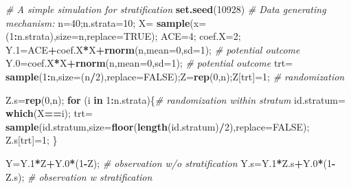 \documentclass[12pt,]{book}
\newenvironment{Shaded}{\begin{snugshade}}{\end{snugshade}}
\newcommand{\KeywordTok}[1]{\textcolor[rgb]{0.13,0.29,0.53}{\textbf{#1}}}
\newcommand{\DataTypeTok}[1]{\textcolor[rgb]{0.13,0.29,0.53}{#1}}
\newcommand{\DecValTok}[1]{\textcolor[rgb]{0.00,0.00,0.81}{#1}}
\newcommand{\StringTok}[1]{\textcolor[rgb]{0.31,0.60,0.02}{#1}}
\newcommand{\CommentTok}[1]{\textcolor[rgb]{0.56,0.35,0.01}{\textit{#1}}}
\newcommand{\OtherTok}[1]{\textcolor[rgb]{0.56,0.35,0.01}{#1}}
\newcommand{\ControlFlowTok}[1]{\textcolor[rgb]{0.13,0.29,0.53}{\textbf{#1}}}
\newcommand{\OperatorTok}[1]{\textcolor[rgb]{0.81,0.36,0.00}{\textbf{#1}}}
\newcommand{\NormalTok}[1]{#1}
\begin{document}
\begin{Shaded}
\begin{Highlighting}[]
\CommentTok{# A simple simulation for stratification }
\KeywordTok{set.seed}\NormalTok{(}\DecValTok{10928}\NormalTok{)}
\CommentTok{# Data generating mechanism: }
\NormalTok{n=}\DecValTok{40}\NormalTok{;n.strata=}\DecValTok{10}\NormalTok{;}
\NormalTok{X=}\StringTok{ }\KeywordTok{sample}\NormalTok{(}\DataTypeTok{x=}\NormalTok{(}\DecValTok{1}\OperatorTok{:}\NormalTok{n.strata),}\DataTypeTok{size=}\NormalTok{n,}\DataTypeTok{replace=}\OtherTok{TRUE}\NormalTok{);}
\NormalTok{ACE=}\DecValTok{4}\NormalTok{; coef.X=}\DecValTok{2}\NormalTok{; }
\NormalTok{Y.}\DecValTok{1}\NormalTok{=ACE}\OperatorTok{+}\NormalTok{coef.X}\OperatorTok{*}\NormalTok{X}\OperatorTok{+}\KeywordTok{rnorm}\NormalTok{(n,}\DataTypeTok{mean=}\DecValTok{0}\NormalTok{,}\DataTypeTok{sd=}\DecValTok{1}\NormalTok{); }\CommentTok{# potential outcome}
\NormalTok{Y.}\DecValTok{0}\NormalTok{=coef.X}\OperatorTok{*}\NormalTok{X}\OperatorTok{+}\KeywordTok{rnorm}\NormalTok{(n,}\DataTypeTok{mean=}\DecValTok{0}\NormalTok{,}\DataTypeTok{sd=}\DecValTok{1}\NormalTok{); }\CommentTok{# potential outcome }
\NormalTok{trt=}\StringTok{ }\KeywordTok{sample}\NormalTok{(}\DecValTok{1}\OperatorTok{:}\NormalTok{n,}\DataTypeTok{size=}\NormalTok{(n}\OperatorTok{/}\DecValTok{2}\NormalTok{),}\DataTypeTok{replace=}\OtherTok{FALSE}\NormalTok{);Z=}\KeywordTok{rep}\NormalTok{(}\DecValTok{0}\NormalTok{,n);Z[trt]=}\DecValTok{1}\NormalTok{; }\CommentTok{# randomization}

\NormalTok{Z.s=}\KeywordTok{rep}\NormalTok{(}\DecValTok{0}\NormalTok{,n);}
\ControlFlowTok{for}\NormalTok{ (i }\ControlFlowTok{in} \DecValTok{1}\OperatorTok{:}\NormalTok{n.strata)\{}\CommentTok{# randomization within stratum }
\NormalTok{  id.stratum=}\StringTok{ }\KeywordTok{which}\NormalTok{(X}\OperatorTok{==}\NormalTok{i);}
\NormalTok{  trt=}\StringTok{ }\KeywordTok{sample}\NormalTok{(id.stratum,}\DataTypeTok{size=}\KeywordTok{floor}\NormalTok{(}\KeywordTok{length}\NormalTok{(id.stratum)}\OperatorTok{/}\DecValTok{2}\NormalTok{),}\DataTypeTok{replace=}\OtherTok{FALSE}\NormalTok{);}
\NormalTok{  Z.s[trt]=}\DecValTok{1}\NormalTok{; }
\NormalTok{\}}

\NormalTok{Y=Y.}\DecValTok{1}\OperatorTok{*}\NormalTok{Z}\OperatorTok{+}\NormalTok{Y.}\DecValTok{0}\OperatorTok{*}\NormalTok{(}\DecValTok{1}\OperatorTok{-}\NormalTok{Z); }\CommentTok{# observation w/o stratification }
\NormalTok{Y.s=Y.}\DecValTok{1}\OperatorTok{*}\NormalTok{Z.s}\OperatorTok{+}\NormalTok{Y.}\DecValTok{0}\OperatorTok{*}\NormalTok{(}\DecValTok{1}\OperatorTok{-}\NormalTok{Z.s); }\CommentTok{# observation w stratification }
\end{Highlighting}
\end{Shaded}
\end{document}
